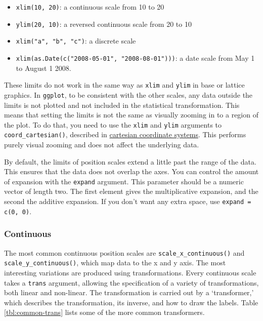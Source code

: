 \begin{itemize}
\itemsep1pt\parskip0pt
\item
  \texttt{xlim(10, 20)}: a continuous scale from 10 to 20
\item
  \texttt{ylim(20, 10)}: a reversed continuous scale from 20 to 10
\item
  \texttt{xlim("a", "b", "c")}: a discrete scale
\item
  \texttt{xlim(as.Date(c("2008-05-01", "2008-08-01")))}: a date scale
  from May 1 to August 1 2008.
\end{itemize}

These limits do not work in the same way as \texttt{xlim} and
\texttt{ylim} in base or lattice graphics. In \texttt{ggplot}, to be
consistent with the other scales, any data outside the limits is not
plotted and not included in the statistical transformation. This means
that setting the limits is not the same as visually zooming in to a
region of the plot. To do that, you need to use the \texttt{xlim} and
\texttt{ylim} arguments to \texttt{coord\_cartesian()}, described in
\hyperref[sub:cartesian]{cartesian coordinate systems}. This performs
purely visual zooming and does not affect the underlying data.

By default, the limits of position scales extend a little past the range
of the data. This ensures that the data does not overlap the axes. You
can control the amount of expansion with the \texttt{expand} argument.
This parameter should be a numeric vector of length two. The first
element gives the multiplicative expansion, and the second the additive
expansion. If you don't want any extra space, use
\texttt{expand = c(0, 0)}. 

\subsubsection{Continuous}\label{ssub:scale-continuous}

The most common continuous position scales are
\texttt{scale\_x\_continuous()} and \texttt{scale\_y\_continuous()},
which map data to the x and y axis. 
The most interesting variations are produced using transformations.
Every continuous scale takes a \texttt{trans} argument, allowing the
specification of a variety of transformations, both linear and
non-linear. The transformation is carried out by a `transformer,' which
describes the transformation, its inverse, and how to draw the labels.
Table \ref{tbl:common-trans} lists some of the more common transformers.
 
 

